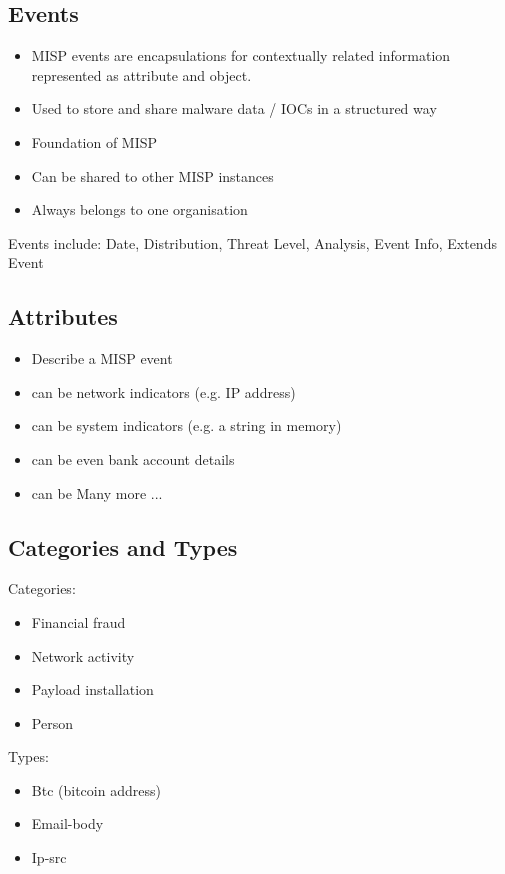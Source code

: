 \subsection{Events}
\begin{itemize}
    \item MISP events are encapsulations for contextually related information represented as attribute and object.
    \item Used to store and share malware data / IOCs in a structured way
    \item Foundation of MISP
    \item Can be shared to other MISP instances
    \item Always belongs to one organisation
\end{itemize}
Events include: Date, Distribution, Threat Level, Analysis, Event Info, Extends Event

\subsection{Attributes}
\begin{itemize}
    \item Describe a MISP event
    \item can be network indicators (e.g. IP address)
    \item can be system indicators (e.g. a string in memory)
    \item can be even bank account details
    \item can be Many more ...
\end{itemize}

\subsection{Categories and Types}
Categories:
\begin{itemize}
    \item Financial fraud
    \item Network activity
    \item Payload installation
    \item Person
\end{itemize}
Types:
\begin{itemize}
    \item Btc (bitcoin address)
    \item Email-body
    \item Ip-src  
\end{itemize}

